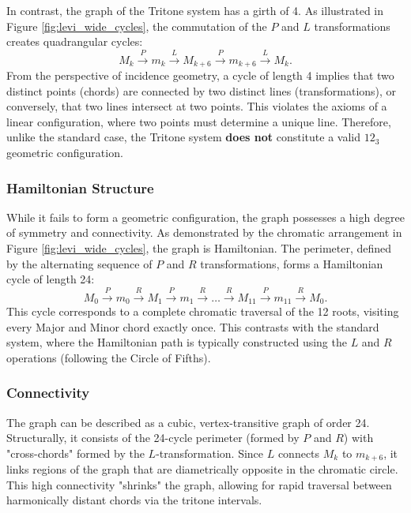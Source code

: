 \documentclass[12pt,letterpaper]{amsart}
\begin{document}
In contrast, the graph of the Tritone system has a girth of 4. As illustrated in Figure \ref{fig:levi_wide_cycles}, the commutation of the $P$ and $L$ transformations creates quadrangular cycles:
\begin{equation}
    M_k \xrightarrow{P} m_k \xrightarrow{L} M_{k+6} \xrightarrow{P} m_{k+6} \xrightarrow{L} M_k.
\end{equation}
From the perspective of incidence geometry, a cycle of length 4 implies that two distinct points (chords) are connected by two distinct lines (transformations), or conversely, that two lines intersect at two points. This violates the axioms of a linear configuration, where two points must determine a unique line. Therefore, unlike the standard case, the Tritone system \textbf{does not} constitute a valid $12_3$ geometric configuration.

\subsubsection{Hamiltonian Structure}
While it fails to form a geometric configuration, the graph possesses a high degree of symmetry and connectivity. As demonstrated by the chromatic arrangement in Figure \ref{fig:levi_wide_cycles}, the graph is Hamiltonian. The perimeter, defined by the alternating sequence of $P$ and $R$ transformations, forms a Hamiltonian cycle of length 24:
\begin{equation}
    M_0 \xrightarrow{P} m_0 \xrightarrow{R} M_1 \xrightarrow{P} m_1 \xrightarrow{R} \dots \xrightarrow{R} M_{11} \xrightarrow{P} m_{11} \xrightarrow{R} M_0.
\end{equation}
This cycle corresponds to a complete chromatic traversal of the 12 roots, visiting every Major and Minor chord exactly once. This contrasts with the standard system, where the Hamiltonian path is typically constructed using the $L$ and $R$ operations (following the Circle of Fifths).

\subsubsection{Connectivity}
The graph can be described as a cubic, vertex-transitive graph of order 24. Structurally, it consists of the 24-cycle perimeter (formed by $P$ and $R$) with "cross-chords" formed by the $L$-transformation. Since $L$ connects $M_k$ to $m_{k+6}$, it links regions of the graph that are diametrically opposite in the chromatic circle. This high connectivity "shrinks" the graph, allowing for rapid traversal between harmonically distant chords via the tritone intervals.
\end{document}
